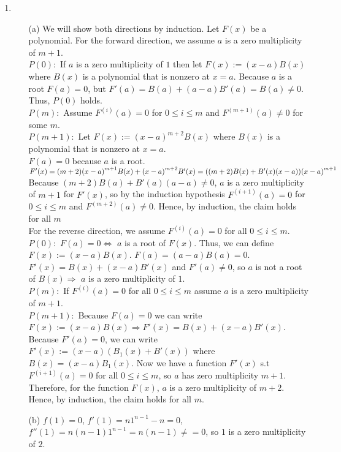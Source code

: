 \documentclass[10pt]{article}
\begin{document}
\begin{enumerate}[label= (Q-\arabic*)]
\item \begin{itemize}
    \item [(a)] We will show both directions by induction. Let $F(x)$ be a polynomial. For the forward direction, we assume $a$ is a zero multiplicity of $m+1$.\\
    $P(0):$ If $a$ is a zero multiplicity of $1$ then let $F(x):=(x-a)B(x)$ where $B(x)$ is a polynomial that is nonzero at $x=a$. 
    Because $a$ is a root $F(a)=0$, but $F'(a)=B(a)+(a-a)B'(a)=B(a)\neq0$. Thus, $P(0)$ holds.\\
    $P(m):$ Assume $F^{(i)}(a)=0$ for $0\le i\le m$ and $F^{(m+1)}(a)\neq0$ for some $m$.\\
    $P(m+1):$ Let $F(x):={(x-a)}^{m+2}B(x)$ where $B(x)$ is a polynomial that is nonzero at $x=a$.\\ 
    $F(a)=0$ because $a$ is a root.
    $F'(x)=(m+2){(x-a)}^{m+1}B(x)+{(x-a)}^{m+2}B'(x)\\
    =((m+2)B(x)+B'(x)(x-a)){(x-a)}^{m+1}$\\
    Because $(m+2)B(a)+B'(a)(a-a)\neq0$, $a$ is a zero multiplicity of $m+1$ for $F'(x)$, so by the induction hypothesis $F^{(i+1)}(a)=0$ for $0\le i\le m$ and $F^{(m+2)}(a)\neq0$.
    Hence, by induction, the claim holds for all $m$\\
    For the reverse direction, we assume $F^{(i)}(a)=0$ for all $0\le i\le m$.\\
    $P(0):$ $F(a)=0\Leftrightarrow$ $a$ is a root of $F(x)$. Thus, we can define $F(x):=(x-a)B(x)$. $F(a)=(a-a)B(a)=0$. $F'(x)=B(x)+(x-a)B'(x)$ and $F'(a)\neq0$, so $a$ is not a root of $B(x)\Rightarrow$ $a$ is a zero multiplicity of $1$.\\
    $P(m):$ If $F^{(i)}(a)=0$ for all $0\le i\le m$ assume $a$ is a zero multiplicity of $m+1$.\\
    $P(m+1):$ Because $F(a)=0$ we can write $F(x):=(x-a)B(x)\Rightarrow F'(x)=B(x)+(x-a)B'(x)$. 
    Because $F'(a)=0$, we can write $F'(x):=(x-a)(B_1(x)+B'(x))$ where $B(x)=(x-a)B_1(x)$. 
    Now we have a function $F'(x)$ s.t $F^{(i+1)}(a)=0$ for all $0\le i\le m$, so $a$ has zero multiplicity $m+1$.
    Therefore, for the function $F(x)$, $a$ is a zero multiplicity of $m+2$.
    Hence, by induction, the claim holds for all $m$.
    \item [(b)] $f(1)=0$, $f'(1)=n1^{n-1}-n=0$, $f''(1)=n(n-1)1^{n-1}=n(n-1)\neq=0$, so $1$ is a zero multiplicity of $2$.


\end{itemize}
\end{enumerate}
\end{document}
